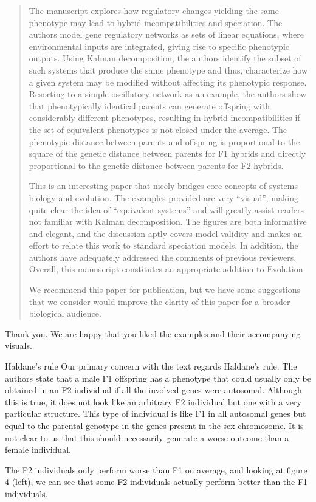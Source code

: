 
\begin{quote}
The manuscript explores how regulatory changes yielding the same phenotype may lead to hybrid incompatibilities and speciation. The authors model gene regulatory networks as sets of linear equations, where environmental inputs are integrated, giving rise to specific phenotypic outputs. Using Kalman decomposition, the authors identify the subset of such systems that produce the same phenotype and thus, characterize how a given system may be modified without affecting its phenotypic response. Resorting to a simple oscillatory network as an example, the authors show that phenotypically identical parents can generate offspring with considerably different phenotypes, resulting in hybrid incompatibilities if the set of equivalent phenotypes is not closed under the average. The phenotypic distance between parents and offspring is proportional to the square of the genetic distance between parents for F1 hybrids and directly proportional to the genetic distance between parents for F2 hybrids.

This is an interesting paper that nicely bridges core concepts of systems biology and evolution. The examples provided are very ``visual'', making quite clear the idea of ``equivalent systems'' and will greatly assist readers not familiar with Kalman decomposition. The figures are both informative and elegant, and the discussion aptly covers model validity and makes an effort to relate this work to standard speciation models. In addition, the authors have adequately addressed the comments of previous reviewers. Overall, this manuscript constitutes an appropriate addition to Evolution.

We recommend this paper for publication, but we have some suggestions that we consider would improve the clarity of this paper for a broader biological audience.
\end{quote}

Thank you. We are happy that you liked the examples and their accompanying visuals. 

\begin{point}{Haldane's rule}
Our primary concern with the text regards Haldane's rule. The authors state that a male F1 offspring has a phenotype that could usually only be obtained in an F2 individual if all the involved genes were autosomal. Although this is true, it does not look like an arbitrary F2 individual but one with a very particular structure. This type of individual is like F1 in all autosomal genes but equal to the parental genotype in the genes present in the sex chromosome. It is not clear to us that this should necessarily generate a worse outcome than a female individual.

The F2 individuals only perform worse than F1 on average, and looking at figure 4 (left), we can see that some F2 individuals actually perform better than the F1 individuals.
\end{point}

